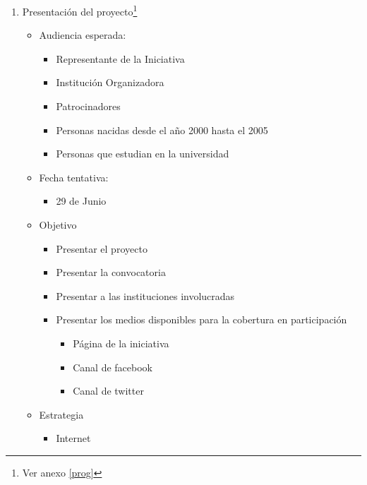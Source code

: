 \documentclass{article}
\begin{document}
\begin{enumerate}
\item Presentación del proyecto\footnote{Ver anexo \ref{prog}}
\begin{itemize}
\item Audiencia esperada:
\begin{itemize}
\item Representante de la Iniciativa
\item Institución Organizadora
\item Patrocinadores
\item Personas nacidas desde el año 2000 hasta el 2005
\item Personas que estudian en la universidad
\end{itemize}
\item Fecha tentativa:
\begin{itemize}
\item 29 de Junio
\end{itemize}
\item Objetivo
\begin{itemize}
\item Presentar el proyecto
\item Presentar la convocatoria
\item Presentar a las instituciones involucradas
\item Presentar los medios disponibles para la cobertura en participación
\begin{itemize}
\item Página de la iniciativa 
\item Canal de facebook
\item Canal de twitter
\end{itemize}
\end{itemize}
\item Estrategia
\begin{itemize}
\item Internet
\end{itemize}
\end{itemize}


\end{enumerate}
\end{document}
